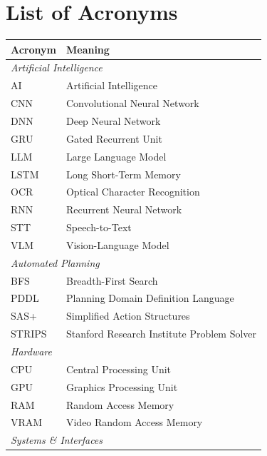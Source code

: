 \chapter*{List of Acronyms}

\begin{table}[H]
    \centering
    \small
    \begin{tabular*}{\textwidth}{@{\extracolsep{\fill}}ll@{}}
        \toprule
        \textbf{Acronym} & \textbf{Meaning} \\
        \midrule
        \multicolumn{2}{l}{\textit{Artificial Intelligence}} \\
        \midrule
        AI      & Artificial Intelligence \\
        CNN     & Convolutional Neural Network \\
        DNN     & Deep Neural Network \\
        GRU     & Gated Recurrent Unit \\
        LLM     & Large Language Model \\
        LSTM    & Long Short-Term Memory \\
        OCR     & Optical Character Recognition \\
        RNN     & Recurrent Neural Network \\
        STT     & Speech-to-Text \\
        VLM     & Vision-Language Model \\
        \midrule
        \multicolumn{2}{l}{\textit{Automated Planning}} \\
        \midrule
        BFS     & Breadth-First Search \\
        PDDL    & Planning Domain Definition Language \\
        SAS+    & Simplified Action Structures \\
        STRIPS  & Stanford Research Institute Problem Solver \\
        \midrule
        \multicolumn{2}{l}{\textit{Hardware}} \\
        \midrule
        CPU     & Central Processing Unit \\
        GPU     & Graphics Processing Unit \\
        RAM     & Random Access Memory \\
        VRAM    & Video Random Access Memory \\
        \midrule
        \multicolumn{2}{l}{\textit{Systems \& Interfaces}} \\
        \midrule

\end{tabular*}
\end{table}
